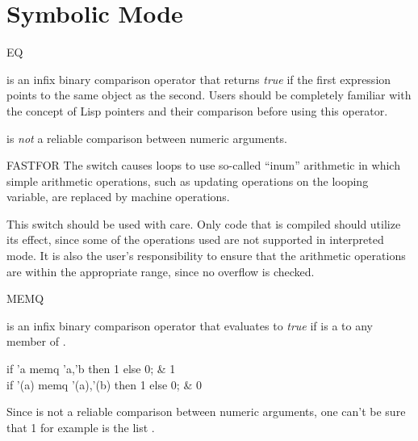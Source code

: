 \newpage
\section{Symbolic Mode}

\begin{Operator}{EQ}
\begin{Syntax}
  
\end{Syntax}

 is an infix binary comparison operator that returns {\em true\/}
if the first expression points to the same object as the second.  Users
should be completely familiar with the concept of Lisp pointers and their
comparison before using this operator.

\begin{Comments}
 is {\em not\/}
a reliable comparison between numeric arguments.
\end{Comments}

\end{Operator}

\begin{Switch}{FASTFOR}
The switch  causes  loops to use so-called
``inum'' arithmetic in which simple arithmetic operations, such as
updating operations on the looping variable, are replaced by machine
operations.

\begin{Comments}
This switch should be used with care.  Only code that is compiled should
utilize its effect, since some of the operations used are not supported
in interpreted mode.  It is also the user's responsibility to ensure that
the arithmetic operations are within the appropriate range, since no
overflow is checked.
\end{Comments}

\end{Switch}


\begin{Operator}{MEMQ}

\begin{Syntax}
  
\end{Syntax}

 is an infix binary comparison operator that evaluates to
{\em true\/} if  is a  to any member of
.

\begin{Examples}
if 'a memq {'a,'b} then 1 else 0; & 1 \\
if '(a) memq {'(a),'(b)} then 1 else 0; & 0
\end{Examples}

\begin{Comments}
Since  is not a reliable comparison between numeric arguments,
one can't be sure that 1 for example is  the list
.
\end{Comments}


\end{Operator}


